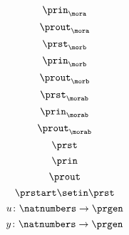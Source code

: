 {\begin{forslides}
\begin{equation}
            \prin_{\mora}
        \end{equation}
        \begin{equation}
            \label{eq:mora-prout}
            \prout_{\mora}
        \end{equation}
        \begin{equation}
            \label{eq:morb-prst}
            \prst_{\morb}
        \end{equation}
        \begin{equation}
            \label{eq:morb-prin}
            \prin_{\morb}
        \end{equation}
        \begin{equation}
            \label{eq:morb-prout}
            \prout_{\morb}
        \end{equation}
        \begin{equation}
            \label{eq:morab-prst}
            \prst_{\morab}
        \end{equation}
        \begin{equation}
            \label{eq:morab-prin}
            \prin_{\morab}
        \end{equation}
        \begin{equation}
            \label{eq:morab-prout}
            \prout_{\morab}
        \end{equation}
        \begin{equation}
            \label{eq:gen-prst}
            \prst
        \end{equation}
        \begin{equation}
            \label{eq:gen-prin}
            \prin
        \end{equation}
        \begin{equation}
            \label{eq:gen-prout}
            \prout
        \end{equation}
        \begin{equation}
            \label{eq:moore-start}
            \prstart \setin \prst
        \end{equation}
        \begin{equation}
            \label{eq:prgen-u}
            u\colon \natnumbers \to \prgen
        \end{equation}
        \begin{equation}
            \label{eq:prgen-y}
            y\colon \natnumbers \to \prgen
        \end{equation}

\end{forslides}}
